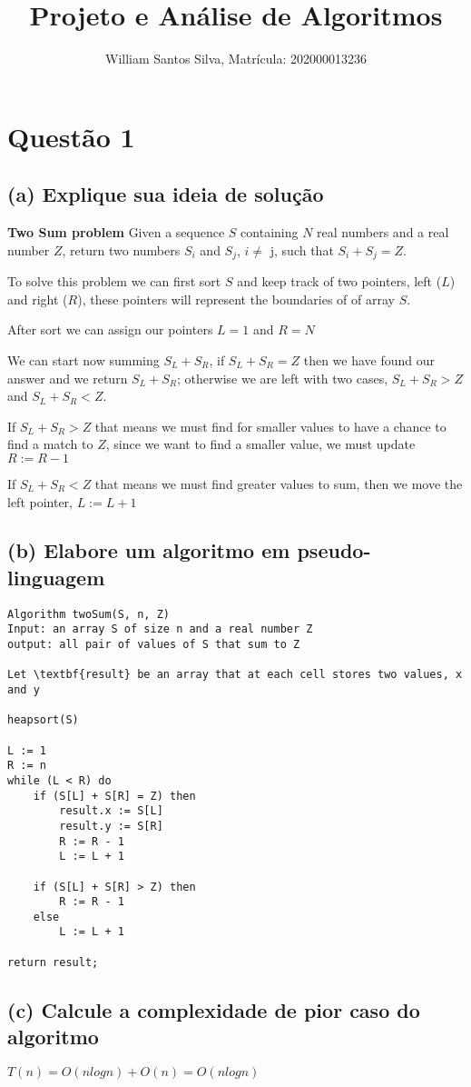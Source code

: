 \documentclass{article}
\title{Projeto e Análise de Algoritmos}
\author{William Santos Silva, Matrícula: 202000013236}
\date{}
\begin{document}
\maketitle

\section*{Questão 1}


\subsection*{(a) Explique sua ideia de solução}

\textbf{Two Sum problem}
Given a sequence $S$ containing $N$ real numbers and a real number $Z$, return two numbers $S_i$ and $S_j$, $i \neq$  j, such that $S_i + S_j = Z$.

To solve this problem we can first sort $S$ and keep track of two pointers, left ($L$) and right ($R$), these pointers will represent the boundaries of of array $S$. 

After sort we can assign our pointers $L = 1$ and $R = N$

We can start now summing $S_L + S_R$,  if $S_L + S_R = Z$ then we have found our answer and we return $S_L + S_R$; otherwise we are left with two cases, $S_L + S_R > Z$ and $S_L + S_R < Z$.

If $S_L + S_R > Z$ that means we must find for smaller values to have a chance to find a match to $Z$, since we want to find a smaller value, we must update $R:=R - 1$

If $S_L + S_R < Z$ that means we must find greater values to sum, then we move the left pointer, $L := L + 1$

\subsection*{(b) Elabore um algoritmo em pseudo-linguagem}

\begin{lstlisting}
Algorithm twoSum(S, n, Z)
Input: an array S of size n and a real number Z
output: all pair of values of S that sum to Z

Let \textbf{result} be an array that at each cell stores two values, x and y

heapsort(S)

L := 1
R := n
while (L < R) do
    if (S[L] + S[R] = Z) then
        result.x := S[L]
        result.y := S[R]
        R := R - 1
        L := L + 1

    if (S[L] + S[R] > Z) then
        R := R - 1
    else    
        L := L + 1

return result;
\end{lstlisting}

\subsection*{(c) Calcule a complexidade de pior caso do algoritmo}

$T(n) = O(nlogn) + O(n) = O(nlogn)$
\end{document}
